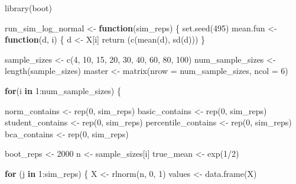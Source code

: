 \documentclass[12pt]{article}
\newenvironment{Shaded}{\begin{snugshade}}{\end{snugshade}}
\newcommand{\AttributeTok}[1]{\textcolor[rgb]{0.77,0.63,0.00}{#1}}
\newcommand{\ControlFlowTok}[1]{\textcolor[rgb]{0.13,0.29,0.53}{\textbf{#1}}}
\newcommand{\DecValTok}[1]{\textcolor[rgb]{0.00,0.00,0.81}{#1}}
\newcommand{\FunctionTok}[1]{\textcolor[rgb]{0.00,0.00,0.00}{#1}}
\newcommand{\NormalTok}[1]{#1}
\newcommand{\OtherTok}[1]{\textcolor[rgb]{0.56,0.35,0.01}{#1}}
\newcommand{\SpecialCharTok}[1]{\textcolor[rgb]{0.00,0.00,0.00}{#1}}
\begin{document}
\begin{Shaded}
\begin{Highlighting}[]
\FunctionTok{library}\NormalTok{(boot)}

\NormalTok{run\_sim\_log\_normal }\OtherTok{\textless{}{-}} \ControlFlowTok{function}\NormalTok{(sim\_reps) \{}
  \FunctionTok{set.seed}\NormalTok{(}\DecValTok{495}\NormalTok{)}
\NormalTok{  mean.fun }\OtherTok{\textless{}{-}} \ControlFlowTok{function}\NormalTok{(d, i) \{}
\NormalTok{    d }\OtherTok{\textless{}{-}}\NormalTok{ X[i]}
    \FunctionTok{return}\NormalTok{ (}\FunctionTok{c}\NormalTok{(}\FunctionTok{mean}\NormalTok{(d), }\FunctionTok{sd}\NormalTok{(d)))}
\NormalTok{  \}}
  
\NormalTok{  sample\_sizes }\OtherTok{\textless{}{-}} \FunctionTok{c}\NormalTok{(}\DecValTok{4}\NormalTok{, }\DecValTok{10}\NormalTok{, }\DecValTok{15}\NormalTok{, }\DecValTok{20}\NormalTok{, }\DecValTok{30}\NormalTok{, }\DecValTok{40}\NormalTok{, }\DecValTok{60}\NormalTok{, }\DecValTok{80}\NormalTok{, }\DecValTok{100}\NormalTok{)}
\NormalTok{  num\_sample\_sizes }\OtherTok{\textless{}{-}} \FunctionTok{length}\NormalTok{(sample\_sizes)}
\NormalTok{  master }\OtherTok{\textless{}{-}} \FunctionTok{matrix}\NormalTok{(}\AttributeTok{nrow =}\NormalTok{ num\_sample\_sizes, }\AttributeTok{ncol =} \DecValTok{6}\NormalTok{)}
  
  \ControlFlowTok{for}\NormalTok{(i }\ControlFlowTok{in} \DecValTok{1}\SpecialCharTok{:}\NormalTok{num\_sample\_sizes) \{}
  
\NormalTok{    norm\_contains }\OtherTok{\textless{}{-}} \FunctionTok{rep}\NormalTok{(}\DecValTok{0}\NormalTok{, sim\_reps)}
\NormalTok{    basic\_contains }\OtherTok{\textless{}{-}} \FunctionTok{rep}\NormalTok{(}\DecValTok{0}\NormalTok{, sim\_reps)}
\NormalTok{    student\_contains }\OtherTok{\textless{}{-}} \FunctionTok{rep}\NormalTok{(}\DecValTok{0}\NormalTok{, sim\_reps)}
\NormalTok{    percentile\_contains }\OtherTok{\textless{}{-}} \FunctionTok{rep}\NormalTok{(}\DecValTok{0}\NormalTok{, sim\_reps)}
\NormalTok{    bca\_contains }\OtherTok{\textless{}{-}} \FunctionTok{rep}\NormalTok{(}\DecValTok{0}\NormalTok{, sim\_reps)}
    
\NormalTok{    boot\_reps }\OtherTok{\textless{}{-}} \DecValTok{2000}
\NormalTok{    n }\OtherTok{\textless{}{-}}\NormalTok{ sample\_sizes[i]}
\NormalTok{    true\_mean }\OtherTok{\textless{}{-}} \FunctionTok{exp}\NormalTok{(}\DecValTok{1}\SpecialCharTok{/}\DecValTok{2}\NormalTok{)}
    
    \ControlFlowTok{for}\NormalTok{ (j }\ControlFlowTok{in} \DecValTok{1}\SpecialCharTok{:}\NormalTok{sim\_reps) \{}
\NormalTok{      X }\OtherTok{\textless{}{-}} \FunctionTok{rlnorm}\NormalTok{(n, }\DecValTok{0}\NormalTok{, }\DecValTok{1}\NormalTok{)}
\NormalTok{      values }\OtherTok{\textless{}{-}} \FunctionTok{data.frame}\NormalTok{(X)}
    

\end{Highlighting}
\end{Shaded}
\end{document}
